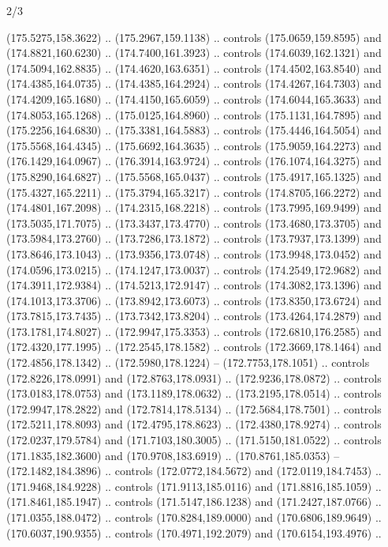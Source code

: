 \begin{flagdescription}{2/3}
\begin{scope}[shift={(0.5\flaglength,0.5)},scale=\flagwidth/320]
\begin{scope}[y=0.8pt, x=0.8pt, yscale=-1,shift={(-118.3,-146)}]
  (175.5275,158.3622) .. (175.2967,159.1138) .. controls (175.0659,159.8595) and
  (174.8821,160.6230) .. (174.7400,161.3923) .. controls (174.6039,162.1321) and
  (174.5094,162.8835) .. (174.4620,163.6351) .. controls (174.4502,163.8540) and
  (174.4385,164.0735) .. (174.4385,164.2924) .. controls (174.4267,164.7303) and
  (174.4209,165.1680) .. (174.4150,165.6059) .. controls (174.6044,165.3633) and
  (174.8053,165.1268) .. (175.0125,164.8960) .. controls (175.1131,164.7895) and
  (175.2256,164.6830) .. (175.3381,164.5883) .. controls (175.4446,164.5054) and
  (175.5568,164.4345) .. (175.6692,164.3635) .. controls (175.9059,164.2273) and
  (176.1429,164.0967) .. (176.3914,163.9724) .. controls (176.1074,164.3275) and
  (175.8290,164.6827) .. (175.5568,165.0437) .. controls (175.4917,165.1325) and
  (175.4327,165.2211) .. (175.3794,165.3217) .. controls (174.8705,166.2272) and
  (174.4801,167.2098) .. (174.2315,168.2218) .. controls (173.7995,169.9499) and
  (173.5035,171.7075) .. (173.3437,173.4770) .. controls (173.4680,173.3705) and
  (173.5984,173.2760) .. (173.7286,173.1872) .. controls (173.7937,173.1399) and
  (173.8646,173.1043) .. (173.9356,173.0748) .. controls (173.9948,173.0452) and
  (174.0596,173.0215) .. (174.1247,173.0037) .. controls (174.2549,172.9682) and
  (174.3911,172.9384) .. (174.5213,172.9147) .. controls (174.3082,173.1396) and
  (174.1013,173.3706) .. (173.8942,173.6073) .. controls (173.8350,173.6724) and
  (173.7815,173.7435) .. (173.7342,173.8204) .. controls (173.4264,174.2879) and
  (173.1781,174.8027) .. (172.9947,175.3353) .. controls (172.6810,176.2585) and
  (172.4320,177.1995) .. (172.2545,178.1582) .. controls (172.3669,178.1464) and
  (172.4856,178.1342) .. (172.5980,178.1224) -- (172.7753,178.1051) .. controls
  (172.8226,178.0991) and (172.8763,178.0931) .. (172.9236,178.0872) .. controls
  (173.0183,178.0753) and (173.1189,178.0632) .. (173.2195,178.0514) .. controls
  (172.9947,178.2822) and (172.7814,178.5134) .. (172.5684,178.7501) .. controls
  (172.5211,178.8093) and (172.4795,178.8623) .. (172.4380,178.9274) .. controls
  (172.0237,179.5784) and (171.7103,180.3005) .. (171.5150,181.0522) .. controls
  (171.1835,182.3600) and (170.9708,183.6919) .. (170.8761,185.0353) --
  (172.1482,184.3896) .. controls (172.0772,184.5672) and (172.0119,184.7453) ..
  (171.9468,184.9228) .. controls (171.9113,185.0116) and (171.8816,185.1059) ..
  (171.8461,185.1947) .. controls (171.5147,186.1238) and (171.2427,187.0766) ..
  (171.0355,188.0472) .. controls (170.8284,189.0000) and (170.6806,189.9649) ..
  (170.6037,190.9355) .. controls (170.4971,192.2079) and (170.6154,193.4976) ..

\end{scope}
\end{scope}
\end{flagdescription}
